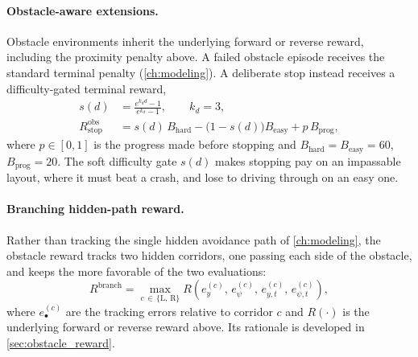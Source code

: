 \paragraph{Obstacle-aware extensions.}
Obstacle environments inherit the underlying forward or reverse reward, including the
proximity penalty above. A failed obstacle episode receives the standard terminal penalty
(\cref{ch:modeling}). A deliberate stop instead receives a difficulty-gated terminal reward,
\begin{align}
s(d) &= \frac{e^{k_d d}-1}{e^{k_d}-1}, \qquad k_d = 3, \\
R_{\mathrm{stop}}^{\mathrm{obs}} &= s(d)\,B_{\mathrm{hard}} - \bigl(1-s(d)\bigr)B_{\mathrm{easy}} + p\,B_{\mathrm{prog}},
\end{align}
where $p \in [0,1]$ is the progress made before stopping and $B_{\mathrm{hard}} = B_{\mathrm{easy}} = 60$,
$B_{\mathrm{prog}} = 20$. The soft difficulty gate $s(d)$ makes stopping pay on an impassable
layout, where it must beat a crash, and lose to driving through on an easy one.

\paragraph{Branching hidden-path reward.}
Rather than tracking the single hidden avoidance path of \cref{ch:modeling}, the obstacle
reward tracks two hidden corridors, one passing each side of the obstacle, and keeps the
more favorable of the two evaluations:
\begin{equation}
R^{\mathrm{branch}} = \max_{c\,\in\,\{\mathrm{L},\,\mathrm{R}\}}
R\!\left(e_y^{(c)},\, e_\psi^{(c)},\, e_{y,t}^{(c)},\, e_{\psi,t}^{(c)}\right),
\label{eq:branching_reward}
\end{equation}
where $e_\bullet^{(c)}$ are the tracking errors relative to corridor $c$ and $R(\cdot)$ is
the underlying forward or reverse reward above. Its rationale is developed in
\cref{sec:obstacle_reward}.
